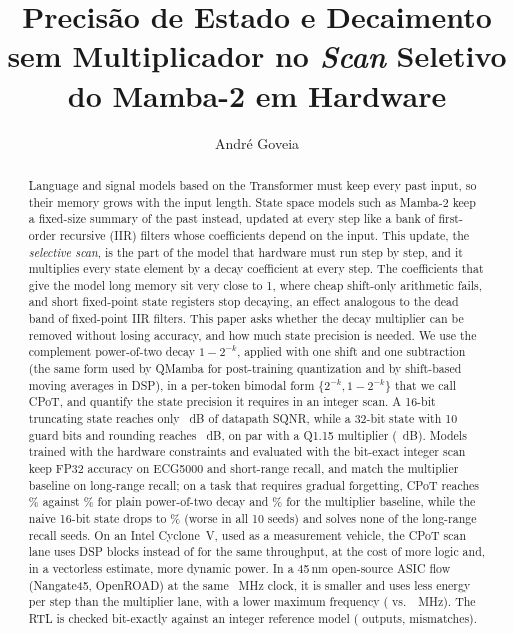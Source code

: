 \documentclass[12pt]{article}
\title{Precisão de Estado e Decaimento sem Multiplicador no \emph{Scan} Seletivo do Mamba-2 em Hardware}
\author{André Goveia\inst{1}}
\begin{document}
\sloppy

\maketitle

\begin{abstract}
Language and signal models based on the Transformer must keep every past input, so their memory grows with the input length. State space models such as Mamba-2 keep a fixed-size summary of the past instead, updated at every step like a bank of first-order recursive (IIR) filters whose coefficients depend on the input. This update, the \emph{selective scan}, is the part of the model that hardware must run step by step, and it multiplies every state element by a decay coefficient at every step. The coefficients that give the model long memory sit very close to 1, where cheap shift-only arithmetic fails, and short fixed-point state registers stop decaying, an effect analogous to the dead band of fixed-point IIR filters. This paper asks whether the decay multiplier can be removed without losing accuracy, and how much state precision is needed. We use the complement power-of-two decay $1-2^{-k}$, applied with one shift and one subtraction (the same form used by QMamba for post-training quantization and by shift-based moving averages in DSP), in a per-token bimodal form $\{2^{-k}, 1-2^{-k}\}$ that we call CPoT, and quantify the state precision it requires in an integer scan. A 16-bit truncating state reaches only \SqnrLegacy~dB of datapath SQNR, while a 32-bit state with 10 guard bits and rounding reaches \SqnrProposed~dB, on par with a Q1.15 multiplier (\SqnrMult~dB). Models trained with the hardware constraints and evaluated with the bit-exact integer scan keep FP32 accuracy on ECG5000 and short-range recall, and match the multiplier baseline on long-range recall; on a task that requires gradual forgetting, CPoT reaches \% against \% for plain power-of-two decay and \% for the multiplier baseline, while the naive 16-bit state drops to \% (worse in all 10 seeds) and solves none of the long-range recall seeds. On an Intel Cyclone~V, used as a measurement vehicle, the CPoT scan lane uses \DspCpot{} DSP blocks instead of \DspMult{} for the same throughput, at the cost of more logic and, in a vectorless estimate, more dynamic power. In a 45\,nm open-source ASIC flow (Nangate45, OpenROAD) at the same \AsicIsoMhz~MHz clock, it is \AsicAreaSaving{} smaller and uses \AsicEnergySaving{} less energy per step than the multiplier lane, with a lower maximum frequency (\AsicFmaxCpot{} vs.\ \AsicFmaxMult~MHz). The RTL is checked bit-exactly against an integer reference model (\VerTotal{} outputs, \VerMism{} mismatches).
\end{abstract}
\end{document}
